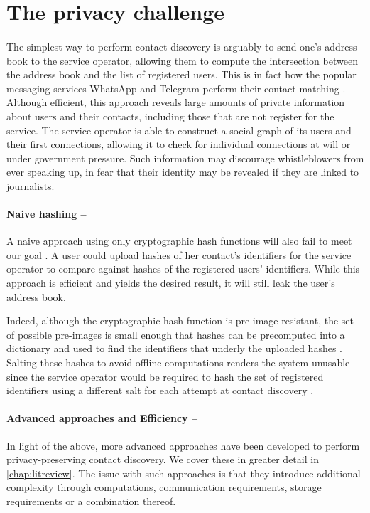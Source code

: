 \section{The privacy challenge}

\paragraph{} The simplest way to perform contact discovery is arguably to send one's address book to the service operator, allowing them to compute the intersection between the address book and the list of registered users. This is in fact how the popular messaging services WhatsApp and Telegram perform their contact matching \cite{Telegram,WhatsApp}. Although efficient, this approach reveals large amounts of private information about  users and their contacts, including those that are not register for the service. The service operator is able to construct a social graph of its users and their first connections, allowing it to check for individual connections at will or under government pressure. Such information may discourage whistleblowers from ever speaking up, in fear that their identity may be revealed if they are linked to journalists.


\paragraph{Naive hashing --}A naive approach using only cryptographic hash functions will also fail to meet our goal \cite{Kales19, Signal:Difficulty}. A user could upload hashes of her contact's identifiers for the service operator to compare against hashes of the registered users' identifiers. While this approach is efficient and yields the desired result, it will still leak the user's address book.

Indeed, although the cryptographic hash function is pre-image resistant, the set of possible pre-images is small enough that hashes can be precomputed into a dictionary and used to find the identifiers that underly the uploaded hashes \cite{Signal:Difficulty}. Salting these hashes to avoid offline computations renders the system unusable since the service operator would be required to hash the set of registered identifiers using a different salt for each attempt at contact discovery \cite{Kales19}.

\paragraph{Advanced approaches and Efficiency --} In light of the above, more advanced approaches have been developed to perform privacy-preserving contact discovery. We cover these in greater detail in \autoref{chap:litreview}. The issue with such approaches is that they introduce additional complexity through computations, communication requirements, storage requirements or a combination thereof.

